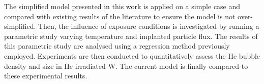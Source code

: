 The simplified model presented in this work is applied on a simple case and compared with existing results of the literature to ensure the model is not over-simplified.
Then, the influence of exposure conditions is investigated by running a parametric study varying temperature and implanted particle flux.
The results of this parametric study are analysed using a regression method previously employed.
Experiments are then conducted to quantitatively assess the He bubble density and size in He irradiated W.
The current model is finally compared to these experimental results.
